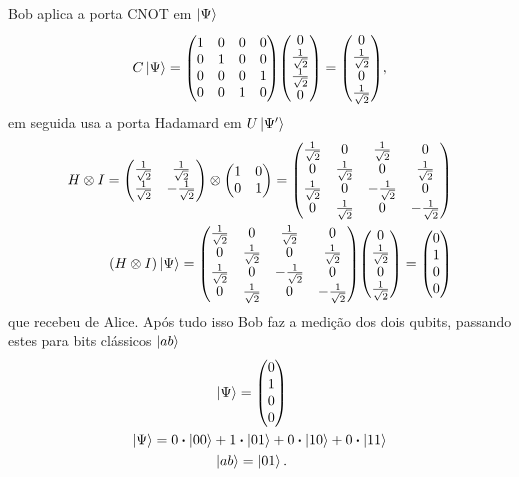 \documentclass[a4paper, 12pt, oneside]{book}
\begin{document}
Bob aplica a porta CNOT em $\ket{\Psi}$
\begin{align*}
C\ket{\Psi} = \mqty(1&0&0&0\\0&1&0&0\\0&0&0&1\\0&0&1&0) 
			\mqty(0\\ \frac{1}{\sqrt{2}}\\ \frac{1}{\sqrt{2}}\\0)
		= \mqty(0\\ \frac{1}{\sqrt{2}}\\ 0\\ \frac{1}{\sqrt{2}}),
\end{align*}
em seguida usa a porta Hadamard em $U\ket{\Psi'}$
\begin{align*}
H \otimes I = \mqty(\frac{1}{\sqrt{2}}&\frac{1}{\sqrt{2}}\\
				\frac{1}{\sqrt{2}}&-\frac{1}{\sqrt{2}} ) 
	\otimes \mqty(1&0\\0&1) 
= \mqty(\frac{1}{\sqrt{2}}&0&\frac{1}{\sqrt{2}}&0\\
	0&\frac{1}{\sqrt{2}}&0&\frac{1}{\sqrt{2}} \\
	\frac{1}{\sqrt{2}}&0&-\frac{1}{\sqrt{2}}&0 \\
	0&\frac{1}{\sqrt{2}}&0&-\frac{1}{\sqrt{2}}) \\
(H \otimes I)\ket{\Psi} =  \mqty(\frac{1}{\sqrt{2}}&0&\frac{1}{\sqrt{2}}&0\\
	0&\frac{1}{\sqrt{2}}&0&\frac{1}{\sqrt{2}} \\
	\frac{1}{\sqrt{2}}&0&-\frac{1}{\sqrt{2}}&0 \\
	0&\frac{1}{\sqrt{2}}&0&-\frac{1}{\sqrt{2}}) 
	\mqty(0\\ \frac{1}{\sqrt{2}}\\ 0\\ \frac{1}{\sqrt{2}}) = \mqty(0\\1\\0\\0)
\end{align*}
que recebeu de Alice. Após tudo isso Bob faz a medição dos dois qubits, passando estes para bits clássicos $\ket{ab}$
\begin{align*}
\ket{\Psi} = \mqty(0\\1\\0\\0) \hspace{2.5cm} \\
\ket{\Psi} = 0\vdot\ket{00} + 1\vdot\ket{01} + 0\vdot\ket{10} + 0\vdot\ket{11} \\
\ket{ab} = \ket{01}. \hspace{2.5cm}
\end{align*}
\end{document}
